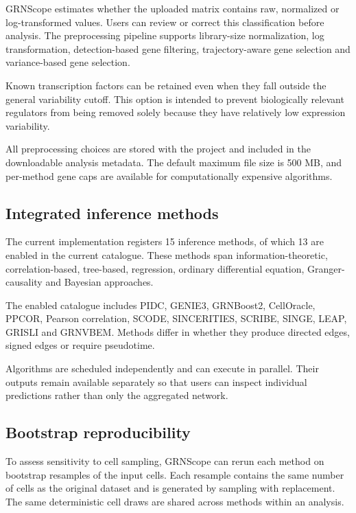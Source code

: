 \documentclass[unnumsec,webpdf,modern,large]{oup-authoring-template}%
\begin{document}
GRNScope estimates whether the uploaded matrix contains raw, normalized or log-transformed values. Users can review or correct this classification before analysis. The preprocessing pipeline supports library-size normalization, log transformation, detection-based gene filtering, trajectory-aware gene selection and variance-based gene selection.

Known transcription factors can be retained even when they fall outside the general variability cutoff. This option is intended to prevent biologically relevant regulators from being removed solely because they have relatively low expression variability.

All preprocessing choices are stored with the project and included in the downloadable analysis metadata. The default maximum file size is 500 MB, and per-method gene caps are available for computationally expensive algorithms.

\subsection{Integrated inference methods}

The current implementation registers 15 inference methods, of which 13 are enabled in the current catalogue. These methods span information-theoretic, correlation-based, tree-based, regression, ordinary differential equation, Granger-causality and Bayesian approaches.

The enabled catalogue includes PIDC, GENIE3, GRNBoost2, CellOracle, PPCOR, Pearson correlation, SCODE, SINCERITIES, SCRIBE, SINGE, LEAP, GRISLI and GRNVBEM. Methods differ in whether they produce directed edges, signed edges or require pseudotime.

Algorithms are scheduled independently and can execute in parallel. Their outputs remain available separately so that users can inspect individual predictions rather than only the aggregated network.

\subsection{Bootstrap reproducibility}

To assess sensitivity to cell sampling, GRNScope can rerun each method on bootstrap resamples of the input cells. Each resample contains the same number of cells as the original dataset and is generated by sampling with replacement. The same deterministic cell draws are shared across methods within an analysis.
\end{document}
